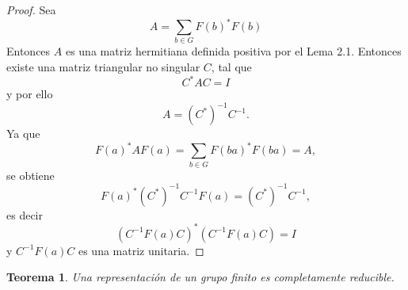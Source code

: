 \documentclass[12pt]{book}
\newtheorem{theorem}{Teorema}[section]
\theoremstyle{definition}
\newcounter{in}
\newcounter{ini}
\begin{document}
\begin{proof}
  Sea
  \begin{equation*}
    A=\sum_{b \in G} F \left(b\right)^{*}F\left(b\right)
  \end{equation*}
  Entonces $A$ es una matriz hermitiana definida positiva por el Lema
  2.1. Entonces existe una matriz triangular no singular $C$, tal que
  \begin{equation*}
    C^{*}AC= I
  \end{equation*}
  y por ello
  \begin{equation}
    \label{eq:9}
    A=(C^{*})^{-1}C^{-1}.
  \end{equation}
  Ya que
  \begin{equation}
    \label{eq:10}
    F\left(a\right)^{*} AF\left(a\right)=\sum_{b \in G} F\left(ba\right)^{*} F\left(ba\right)=A,
  \end{equation}
  se obtiene
  \begin{equation}
    \label{eq:11}
    F\left(a\right)^{*}(C^{*})^{-1}C^{-1}F\left(a\right)=(C^{*})^{-1}C^{-1},
  \end{equation}
  es decir
  \begin{equation}
    \label{eq:12}
    (C^{-1}F(a)C)^{*}(C^{-1}F(a)C)=I
  \end{equation}
  y $C^{-1}F(a)C$ es una matriz unitaria.
\end{proof}
\begin{theorem}
  \label{t2_4}
  Una representación de un grupo finito es
  completamente reducible.
\end{theorem}
\end{document}
